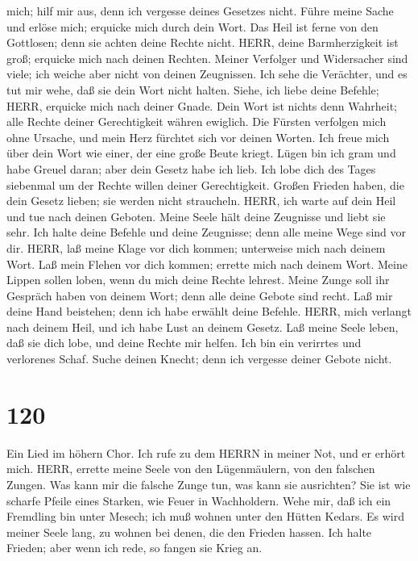 mich; hilf mir aus, denn ich vergesse deines Gesetzes nicht.
 Führe meine Sache und erlöse mich; erquicke mich durch
dein Wort.  Das Heil ist ferne von den Gottlosen; denn sie
achten deine Rechte nicht.  HERR, deine Barmherzigkeit ist
groß; erquicke mich nach deinen Rechten.  Meiner Verfolger
und Widersacher sind viele; ich weiche aber nicht von deinen Zeugnissen.
 Ich sehe die Verächter, und es tut mir wehe, daß sie dein
Wort nicht halten.  Siehe, ich liebe deine Befehle; HERR,
erquicke mich nach deiner Gnade.  Dein Wort ist nichts
denn Wahrheit; alle Rechte deiner Gerechtigkeit währen ewiglich.
 Die Fürsten verfolgen mich ohne Ursache, und mein Herz
fürchtet sich vor deinen Worten.  Ich freue mich über dein
Wort wie einer, der eine große Beute kriegt.  Lügen bin
ich gram und habe Greuel daran; aber dein Gesetz habe ich lieb.
 Ich lobe dich des Tages siebenmal um der Rechte willen
deiner Gerechtigkeit.  Großen Frieden haben, die dein
Gesetz lieben; sie werden nicht straucheln.  HERR, ich
warte auf dein Heil und tue nach deinen Geboten.  Meine
Seele hält deine Zeugnisse und liebt sie sehr.  Ich halte
deine Befehle und deine Zeugnisse; denn alle meine Wege sind vor dir.
 HERR, laß meine Klage vor dich kommen; unterweise mich
nach deinem Wort.  Laß mein Flehen vor dich kommen;
errette mich nach deinem Wort.  Meine Lippen sollen loben,
wenn du mich deine Rechte lehrest.  Meine Zunge soll ihr
Gespräch haben von deinem Wort; denn alle deine Gebote sind recht.
 Laß mir deine Hand beistehen; denn ich habe erwählt deine
Befehle.  HERR, mich verlangt nach deinem Heil, und ich
habe Lust an deinem Gesetz.  Laß meine Seele leben, daß
sie dich lobe, und deine Rechte mir helfen.  Ich bin ein
verirrtes und verlorenes Schaf. Suche deinen Knecht; denn ich vergesse
deiner Gebote nicht.

\hypertarget{section-119}{%
\section{120}\label{section-119}}

 Ein Lied im höhern Chor. Ich rufe zu dem HERRN in meiner
Not, und er erhört mich.  HERR, errette meine Seele von den
Lügenmäulern, von den falschen Zungen.  Was kann mir die
falsche Zunge tun, was kann sie ausrichten?  Sie ist wie
scharfe Pfeile eines Starken, wie Feuer in Wachholdern. 
Wehe mir, daß ich ein Fremdling bin unter Mesech; ich muß wohnen unter
den Hütten Kedars.  Es wird meiner Seele lang, zu wohnen bei
denen, die den Frieden hassen.  Ich halte Frieden; aber wenn
ich rede, so fangen sie Krieg an.

